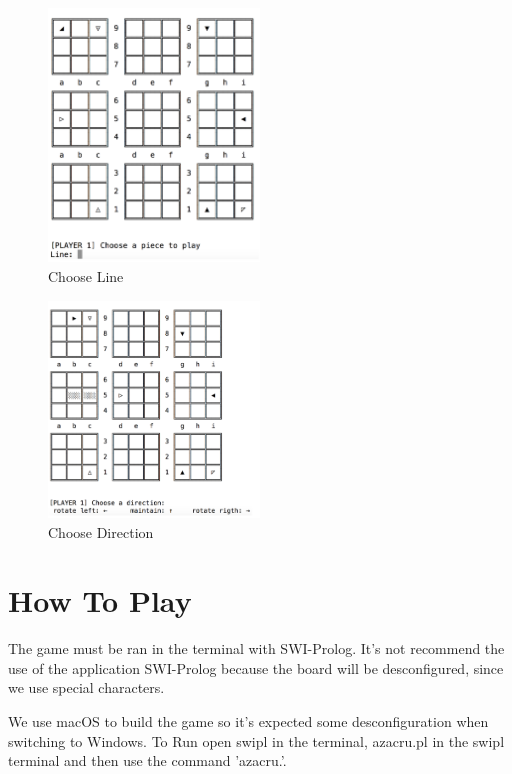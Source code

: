 \documentclass[a4paper]{article}
\begin{document}
\begin{figure}[H]
    \centering
    \includegraphics[width=0.5\textwidth]{Imagem5.png}
    \caption{Choose Line}
    \label{fig:i3}
\end{figure}

\begin{figure}[H]
    \centering
    \includegraphics[width=0.5\textwidth]{Imagem6.png}
    \caption{Choose Direction}
    \label{fig:i4}
\end{figure}

\vspace{10mm}
\section{How To Play}
The game must be ran in the terminal with SWI-Prolog. It's not recommend the use of the application SWI-Prolog because the board will be desconfigured, since we use special characters. 

We use macOS to build the game so it's expected some desconfiguration when switching to Windows.
To Run open swipl in the terminal, azacru.pl in the swipl terminal and then use the command 'azacru.'.
\end{document}
